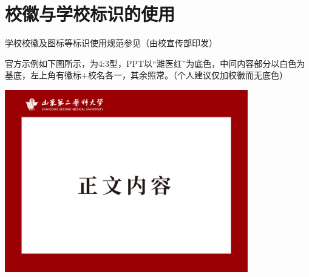 \section[校徽与学校标识的使用]{校徽与学校标识的使用}
学校校徽及图标等标识使用规范参见（由校宣传部印发）

官方示例如下图所示，为4:3型，PPT以“潍医红”\footnotemark 为底色，中间内容部分以白色为基底，左上角有徽标+校名各一，其余照常。（个人建议仅加校徽而无底色）

\begin{table}[H]
    \centering
    \includegraphics[height=300px]{ppt-内容.pdf}
\end{table}

